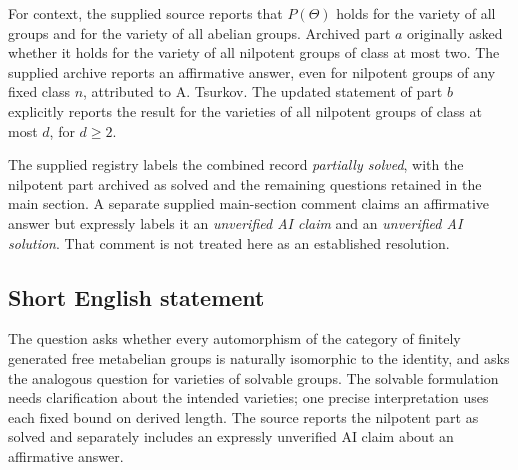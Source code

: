 \documentclass[11pt]{article}
\begin{document}
For context, the supplied source reports that \(P(\Theta)\) holds for the variety of all groups and for the variety of all abelian groups. Archived part \(a\) originally asked whether it holds for the variety of all nilpotent groups of class at most two. The supplied archive reports an affirmative answer, even for nilpotent groups of any fixed class \(n\), attributed to A. Tsurkov. The updated statement of part \(b\) explicitly reports the result for the varieties of all nilpotent groups of class at most \(d\), for \(d\geq2\).

The supplied registry labels the combined record \emph{partially solved}, with the nilpotent part archived as solved and the remaining questions retained in the main section. A separate supplied main-section comment claims an affirmative answer but expressly labels it an \emph{unverified AI claim} and an \emph{unverified AI solution}. That comment is not treated here as an established resolution.
\subsection{Short English statement}
The question asks whether every automorphism of the category of finitely generated free metabelian groups is naturally isomorphic to the identity, and asks the analogous question for varieties of solvable groups. The solvable formulation needs clarification about the intended varieties; one precise interpretation uses each fixed bound on derived length. The source reports the nilpotent part as solved and separately includes an expressly unverified AI claim about an affirmative answer.
\end{document}
